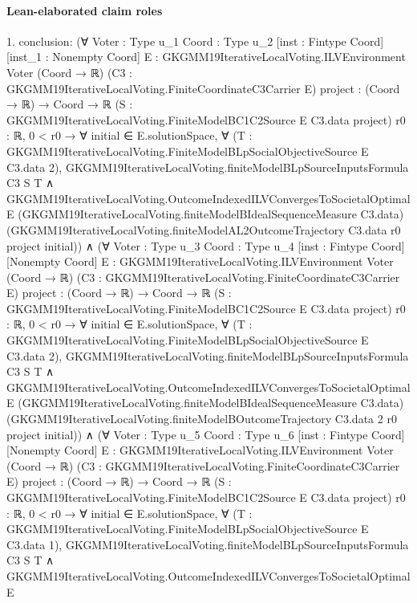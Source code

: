 \documentclass[10pt]{article}
\begin{document}
\paragraph{Lean-elaborated claim roles}\begin{ReviewVerbatim}
1. conclusion: (∀ {Voter : Type u_1} {Coord : Type u_2} [inst : Fintype Coord] [inst_1 : Nonempty Coord]
    {E : GKGMM19IterativeLocalVoting.ILVEnvironment Voter (Coord → ℝ)}
    (C3 : GKGMM19IterativeLocalVoting.FiniteCoordinateC3Carrier E) {project : (Coord → ℝ) → Coord → ℝ}
    (S : GKGMM19IterativeLocalVoting.FiniteModelBC1C2Source E C3.data project) {r0 : ℝ},
    0 < r0 →
      ∀ initial ∈ E.solutionSpace,
        ∀ (T : GKGMM19IterativeLocalVoting.FiniteModelBLpSocialObjectiveSource E C3.data 2),
          GKGMM19IterativeLocalVoting.finiteModelBLpSourceInputsFormula C3 S T ∧
            GKGMM19IterativeLocalVoting.OutcomeIndexedILVConvergesToSocietalOptimal E
              (GKGMM19IterativeLocalVoting.finiteModelBIdealSequenceMeasure C3.data)
              (GKGMM19IterativeLocalVoting.finiteModelAL2OutcomeTrajectory C3.data r0 project initial)) ∧
  (∀ {Voter : Type u_3} {Coord : Type u_4} [inst : Fintype Coord] [Nonempty Coord]
      {E : GKGMM19IterativeLocalVoting.ILVEnvironment Voter (Coord → ℝ)}
      (C3 : GKGMM19IterativeLocalVoting.FiniteCoordinateC3Carrier E) {project : (Coord → ℝ) → Coord → ℝ}
      (S : GKGMM19IterativeLocalVoting.FiniteModelBC1C2Source E C3.data project) {r0 : ℝ},
      0 < r0 →
        ∀ initial ∈ E.solutionSpace,
          ∀ (T : GKGMM19IterativeLocalVoting.FiniteModelBLpSocialObjectiveSource E C3.data 2),
            GKGMM19IterativeLocalVoting.finiteModelBLpSourceInputsFormula C3 S T ∧
              GKGMM19IterativeLocalVoting.OutcomeIndexedILVConvergesToSocietalOptimal E
                (GKGMM19IterativeLocalVoting.finiteModelBIdealSequenceMeasure C3.data)
                (GKGMM19IterativeLocalVoting.finiteModelBOutcomeTrajectory C3.data 2 r0 project initial)) ∧
    (∀ {Voter : Type u_5} {Coord : Type u_6} [inst : Fintype Coord] [Nonempty Coord]
        {E : GKGMM19IterativeLocalVoting.ILVEnvironment Voter (Coord → ℝ)}
        (C3 : GKGMM19IterativeLocalVoting.FiniteCoordinateC3Carrier E) {project : (Coord → ℝ) → Coord → ℝ}
        (S : GKGMM19IterativeLocalVoting.FiniteModelBC1C2Source E C3.data project) {r0 : ℝ},
        0 < r0 →
          ∀ initial ∈ E.solutionSpace,
            ∀ (T : GKGMM19IterativeLocalVoting.FiniteModelBLpSocialObjectiveSource E C3.data 1),
              GKGMM19IterativeLocalVoting.finiteModelBLpSourceInputsFormula C3 S T ∧
                GKGMM19IterativeLocalVoting.OutcomeIndexedILVConvergesToSocietalOptimal E

\end{ReviewVerbatim}
\end{document}
